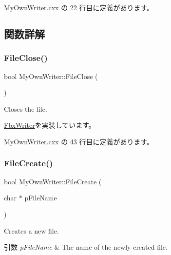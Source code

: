  My\+Own\+Writer.\+cxx の 22 行目に定義があります。



\subsection{関数詳解}
\mbox{\label{class_my_own_writer_a9f834f1899e95c41291188819241df4b}} 
\subsubsection{\texorpdfstring{File\+Close()}{FileClose()}}
{\footnotesize\ttfamily bool My\+Own\+Writer\+::\+File\+Close (\begin{DoxyParamCaption}{ }\end{DoxyParamCaption})\hspace{0.3cm}{\ttfamily [virtual]}}

Closes the file. 

\hyperlink{class_fbx_writer_a0387142f55d0020fd5360759c12aa121}{Fbx\+Writer}を実装しています。



 My\+Own\+Writer.\+cxx の 43 行目に定義があります。

\mbox{\label{class_my_own_writer_aa30bedb6fc76d76b2199143b208161b1}} 
\subsubsection{\texorpdfstring{File\+Create()}{FileCreate()}}
{\footnotesize\ttfamily bool My\+Own\+Writer\+::\+File\+Create (\begin{DoxyParamCaption}\item[{char $\ast$}]{p\+File\+Name }\end{DoxyParamCaption})\hspace{0.3cm}{\ttfamily [virtual]}}

Creates a new file. 
\begin{DoxyParams}{引数}
{\em p\+File\+Name} & The name of the newly created file. \\
\hline
\end{DoxyParams}


